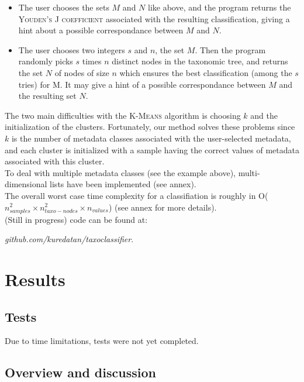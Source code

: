 \documentclass{report}
\begin{document}
\begin{itemize}
\item The user chooses the sets $M$ and $N$ like above, and the program returns the \textsc{Youden’s J coefficient} associated with the resulting classification, giving a hint about a possible correspondance between $M$ and $N$.
\item The user chooses two integers $s$ and $n$, the set $M$. Then the program randomly picks $s$ times $n$ distinct nodes in the taxonomic tree, and returns the set $N$ of nodes of size $n$ which ensures the best classification (among the $s$ tries) for M. It may give a hint of a possible correspondance between $M$ and the resulting set $N$.
\end{itemize}

The two main difficulties with the \textsc{K-Means} algorithm is choosing $k$ and the initialization of the clusters. Fortunately, our method solves these problems since $k$ is the number of metadata classes associated with the user-selected metadata, and each cluster is initialized with a sample having the correct values of metadata associated with this cluster.\\

To deal with multiple metadata classes (see the example above), multi-dimensional lists have been implemented (see annex).\\

The overall worst case time complexity for a classifiation is roughly in O($n_{samples}^{2} \times n_{taxo-nodes}^{2} \times n_{values}$) (see annex for more details).\\

(Still in progress) code can be found at:\\ \begin{center}\emph{github.com/kuredatan/taxoclassifier}.\end{center}

\section{Results}

\subsection{Tests}

Due to time limitations, tests were not yet completed.\\

\subsection{Overview and discussion}
\end{document}
